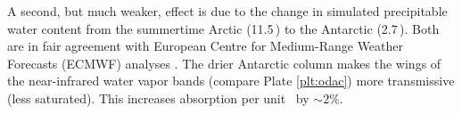 \documentclass[agupp,twoside]{aguplus} %
\begin{document}
A second, but much weaker, effect is due to the change in simulated
precipitable water content from the summertime Arctic (11.5\,\kgxmS) to 
the Antarctic (2.7\,\kgxmS).
Both are in fair agreement with European Centre for Medium-Range
Weather Forecasts (ECMWF) analyses \cite[]{BrB981}. 
The drier Antarctic column makes the wings of the near-infrared
water vapor bands (compare Plate \ref{plt:odac}) more transmissive
(less saturated).
This increases absorption per unit \OdX\ by $\sim 2\%$. 
\end{document}
